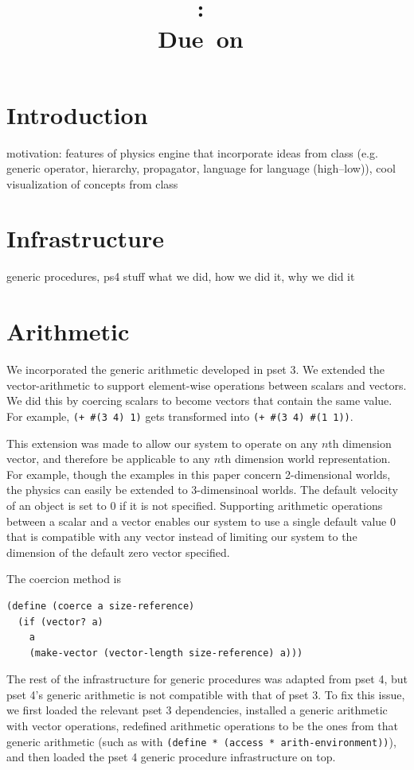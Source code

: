 \documentclass{article}
\title{
    \textmd{\hmwkClass:\ \hmwkTitle}\\
    \small{Due\ on\ \hmwkDueDate}
}
\author{\hmwkAuthorName}
\date{}
\begin{document}
\maketitle
\section{Introduction}

motivation: features of physics engine that incorporate ideas from class (e.g.
generic operator, hierarchy, propagator, language for language (high--low)),
cool visualization of concepts from class

\section{Infrastructure}
generic procedures, ps4 stuff
what we did, how we did it, why we did it

\section{Arithmetic}

We incorporated the generic arithmetic developed in pset 3. We extended the
vector-arithmetic to support element-wise operations between scalars and
vectors. We did this by coercing scalars to become vectors that contain the
same value. For example, \texttt{(+ \#(3 4) 1)} gets transformed into
\texttt{(+ \#(3 4) \#(1 1))}. 

This extension was made to allow our system to operate on any $n$th dimension
vector, and therefore be applicable to any $n$th dimension world
representation. For example, though the examples in this paper concern 2-dimensional worlds, the physics can easily be extended to 3-dimensinoal worlds. The default velocity of an object is set to 0 if it is not
specified. Supporting arithmetic operations between a scalar and a vector
enables our system to use a single default value 0 that is compatible with any
vector instead of limiting our system to the dimension of the default zero
vector specified.  

The coercion method is 
\begin{verbatim}
(define (coerce a size-reference)
  (if (vector? a)
    a
    (make-vector (vector-length size-reference) a)))
\end{verbatim}

The rest of the infrastructure for generic procedures was adapted from pset 4,
but pset 4's generic arithmetic is not compatible with that of pset 3. To fix
this issue, we first loaded the relevant pset 3 dependencies, installed a
generic arithmetic with vector operations, redefined arithmetic operations to
be the ones from that generic arithmetic (such as with \texttt{(define *
(access * arith-environment))}), and then loaded the pset 4 generic procedure
infrastructure on top.
\end{document}
